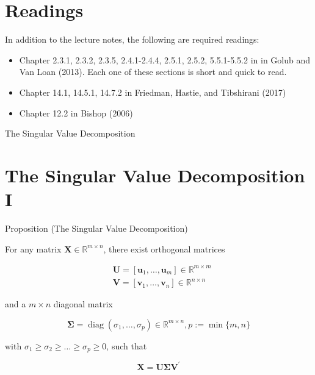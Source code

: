 \documentclass[11pt]{article}
\theoremstyle{plain} %
\theoremstyle{remark}
\begin{document}
\begin{center}

  {}
\end{center}
\vspace{2em}

\tableofcontents

\section*{Readings}
In addition to the lecture notes, the following are required readings:

\begin{itemize}
  \item Chapter 2.3.1, 2.3.2, 2.3.5, 2.4.1-2.4.4, 2.5.1, 2.5.2, 5.5.1-5.5.2 in in Golub and Van Loan (2013). Each one of these sections is short and quick to read.
  \item Chapter 14.1, 14.5.1, 14.7.2 in Friedman, Hastie, and Tibshirani (2017)
  \item Chapter 12.2 in Bishop (2006)
\end{itemize}

The Singular Value Decomposition

\section*{The Singular Value Decomposition I}
Proposition (The Singular Value Decomposition)

For any matrix $\mathbf{X} \in \mathbb{R}^{m \times n}$, there exist orthogonal matrices

$$
\begin{aligned}
& \mathbf{U}=\left[\mathbf{u}_{1}, \ldots, \mathbf{u}_{m}\right] \in \mathbb{R}^{m \times m} \\
& \mathbf{V}=\left[\mathbf{v}_{1}, \ldots, \mathbf{v}_{n}\right] \in \mathbb{R}^{n \times n}
\end{aligned}
$$

and a $m \times n$ diagonal matrix

$$
\boldsymbol{\Sigma}=\operatorname{diag}\left(\sigma_{1}, \ldots, \sigma_{p}\right) \in \mathbb{R}^{m \times n}, p:=\min \{m, n\}
$$

with $\sigma_{1} \geq \sigma_{2} \geq \ldots \geq \sigma_{p} \geq 0$, such that

$$
\mathbf{X}=\mathbf{U} \boldsymbol{\Sigma} \mathbf{V}^{\prime}
$$
\end{document}
